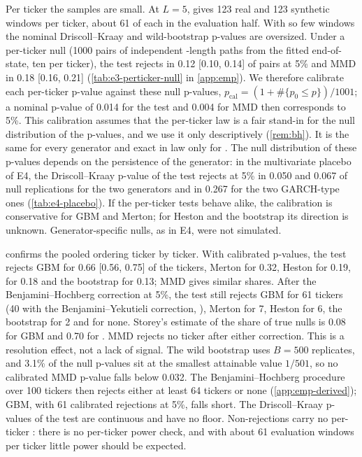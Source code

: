 Per ticker the samples are small. At $L=5$, \TEST{} gives 123 real and 123 synthetic windows per
ticker, about 61 of each in the evaluation half. With so few windows the nominal Driscoll--Kraay
and wild-bootstrap p-values are oversized. Under a per-ticker \GARCHt{} null (1000 pairs of
independent \TEST{}-length paths from the fitted end-of-\TRAIN{} state, ten per ticker), the
\WC{} test rejects in 0.12 [0.10, 0.14] of pairs at 5\% and MMD in 0.18 [0.16, 0.21]
(\cref{tab:e3-perticker-null} in \cref{app:emp}). We therefore calibrate each per-ticker
p-value against these null p-values, $p_{\mathrm{cal}}=(1+\#\{p_0\le p\})/1001$; a nominal
p-value of 0.014 for the \WC{} test and 0.004 for MMD then corresponds to 5\%. This calibration
assumes that the per-ticker \GARCHt{} law is a fair stand-in for the null distribution of the
p-values, and we use it only descriptively (\cref{rem:bh}). It is the same for every generator
and exact in law only for \GARCHt{}. The null distribution of these p-values depends on the
persistence of the generator: in the multivariate placebo of E4, the Driscoll--Kraay p-value of
the \WC{} test rejects at 5\% in 0.050 and 0.067 of null replications for the two \iid{}
generators and in 0.267 for the two GARCH-type ones (\cref{tab:e4-placebo}). If the per-ticker
tests behave alike, the \GARCHt{} calibration is conservative for GBM and Merton; for Heston and
the bootstrap its direction is unknown. Generator-specific nulls, as in E4, were not simulated.

 confirms the pooled ordering ticker by ticker. With calibrated p-values,
the \WC{} test rejects GBM for 0.66 [0.56, 0.75] of the tickers, Merton for 0.32, Heston for
0.19, \GARCHt{} for 0.18 and the bootstrap for 0.13; MMD gives similar shares. After the
Benjamini--Hochberg correction \citep{benjamini1995controlling} at 5\%, the \WC{} test still
rejects GBM for 61 tickers (40 with the Benjamini--Yekutieli correction,
\citealp{benjamini2001control}), Merton for 7, Heston for 6, the bootstrap for 2 and \GARCHt{} for
none. Storey's estimate of the share of true nulls \citep{storey_2002_direct} is 0.08 for GBM and
0.70 for \GARCHt{}. MMD rejects no ticker after either correction. This is a resolution effect,
not a lack of signal. The wild bootstrap uses $B=500$ replicates, and 3.1\% of the null p-values
sit at the smallest attainable value $1/501$, so no calibrated MMD p-value falls below 0.032.
The Benjamini--Hochberg procedure over 100 tickers then rejects either at least 64 tickers or none
(\cref{app:emp-derived}); GBM, with 61 calibrated rejections at 5\%, falls short. The Driscoll--Kraay
p-values of the \WC{} test are continuous and have no floor. Non-rejections carry no per-ticker
\GOOD{}: there is no per-ticker power check, and with about 61 evaluation windows per ticker
little power should be expected.

